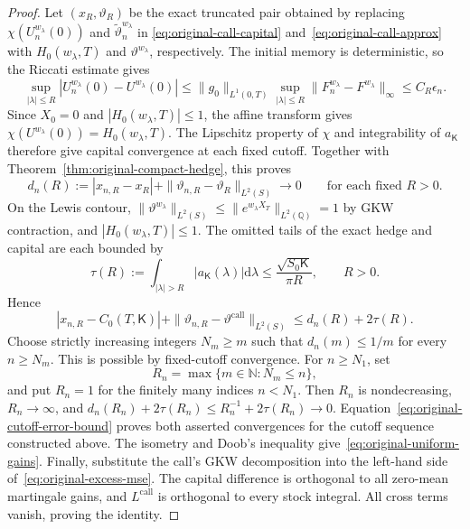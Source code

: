 \documentclass[11pt]{article}
\theoremstyle{definition}
\theoremstyle{remark}
\newcommand{\Q}{\mathbb{Q}}
\newcommand{\1}{\mathbf{1}}
\newcommand{\dd}{\mathrm{d}}
\newcommand{\cK}{\mathsf{K}}
\begin{document}
\begin{proof}
Let $(x_R,\vartheta_R)$ be the exact truncated pair obtained by replacing
$\chi(U_n^{w_\lambda}(0))$ and $\widetilde\vartheta_n^{w_\lambda}$ in
\eqref{eq:original-call-capital} and~\eqref{eq:original-call-approx} with
$H_0(w_\lambda,T)$ and $\vartheta^{w_\lambda}$, respectively.
The initial memory is deterministic, so the Riccati estimate gives
\[
 \sup_{|\lambda|\leq R}|U_n^{w_\lambda}(0)-U^{w_\lambda}(0)|
 \leq\|g_0\|_{L^1(0,T)}
       \sup_{|\lambda|\leq R}\|F_n^{w_\lambda}-F^{w_\lambda}\|_\infty
 \leq C_R\epsilon_n.
\]
Since $X_0=0$ and $|H_0(w_\lambda,T)|\leq1$, the affine transform gives
$\chi(U^{w_\lambda}(0))=H_0(w_\lambda,T)$.
The Lipschitz property of $\chi$ and integrability of $a_{\cK}$ therefore
give capital convergence at each fixed cutoff. Together with
Theorem~\ref{thm:original-compact-hedge}, this proves
\[
 d_n(R):=|x_{n,R}-x_R|
       +\|\vartheta_{n,R}-\vartheta_R\|_{L^2(S)}\longrightarrow0
 \qquad\text{for each fixed }R>0.
\]
On the Lewis contour,
$\|\vartheta^{w_\lambda}\|_{L^2(S)}\leq
\|e^{w_\lambda X_T}\|_{L^2(\Q)}=1$ by GKW contraction, and
$|H_0(w_\lambda,T)|\leq1$. The omitted tails of the exact hedge and
capital are each bounded by
\[
 \tau(R):=\int_{|\lambda|>R}|a_{\cK}(\lambda)|\dd\lambda
 \leq\frac{\sqrt{S_0\cK}}{\pi R},\qquad R>0.
\]
Hence
\begin{equation}
\label{eq:original-cutoff-error-bound}
 |x_{n,R}-C_0(T,\cK)|
 +\|\vartheta_{n,R}-\vartheta^{\mathrm{call}}\|_{L^2(S)}
 \leq d_n(R)+2\tau(R).
\end{equation}
Choose strictly increasing integers $N_m\geq m$ such that
$d_n(m)\leq1/m$ for every $n\geq N_m$. This is possible by fixed-cutoff
convergence. For $n\geq N_1$, set
\[
 R_n=\max\{m\in\mathbb N:N_m\leq n\},
\]
and put $R_n=1$ for the finitely many indices $n<N_1$.
Then $R_n$ is nondecreasing, $R_n\to\infty$, and
$d_n(R_n)+2\tau(R_n)\leq R_n^{-1}+2\tau(R_n)\to0$.
Equation~\eqref{eq:original-cutoff-error-bound} proves both asserted
convergences for the cutoff sequence constructed above.
The isometry and Doob's inequality give~\eqref{eq:original-uniform-gains}.
Finally, substitute the call's GKW decomposition into the left-hand side
of~\eqref{eq:original-excess-mse}. The capital difference is orthogonal to
all zero-mean martingale gains, and $L^{\mathrm{call}}$ is orthogonal to
every stock integral. All cross terms vanish, proving the identity.
\end{proof}
\end{document}
